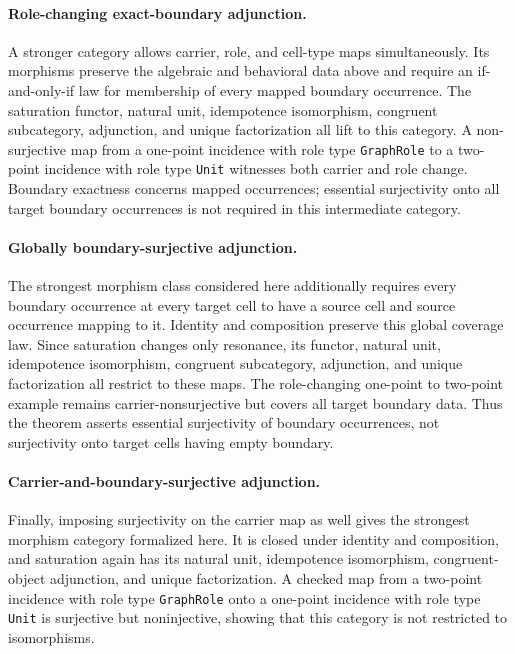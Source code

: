 \documentclass[11pt]{article}
\theoremstyle{definition}
\begin{document}
\paragraph{Role-changing exact-boundary adjunction.}
A stronger category allows carrier, role, and cell-type maps simultaneously.
Its morphisms preserve the algebraic and behavioral data above and require an
if-and-only-if law for membership of every mapped boundary occurrence.  The
saturation functor, natural unit, idempotence isomorphism, congruent
subcategory, adjunction, and unique factorization all lift to this category.  A
non-surjective map from a one-point incidence with role type
\texttt{GraphRole} to a two-point incidence with role type \texttt{Unit}
witnesses both carrier and role change.  Boundary exactness concerns mapped
occurrences; essential surjectivity onto all target boundary occurrences is
not required in this intermediate category.

\paragraph{Globally boundary-surjective adjunction.}
The strongest morphism class considered here additionally requires every
boundary occurrence at every target cell to have a source cell and source
occurrence mapping to it.  Identity and composition preserve this global
coverage law.  Since saturation changes only resonance, its functor, natural
unit, idempotence isomorphism, congruent subcategory, adjunction, and unique
factorization all restrict to these maps.  The role-changing one-point to
two-point example remains carrier-nonsurjective but covers all target boundary
data.  Thus the theorem asserts essential surjectivity of boundary occurrences,
not surjectivity onto target cells having empty boundary.

\paragraph{Carrier-and-boundary-surjective adjunction.}
Finally, imposing surjectivity on the carrier map as well gives the strongest
morphism category formalized here.  It is closed under identity and
composition, and saturation again has its natural unit, idempotence
isomorphism, congruent-object adjunction, and unique factorization.  A checked
map from a two-point incidence with role type \texttt{GraphRole} onto a
one-point incidence with role type \texttt{Unit} is surjective but
noninjective, showing that this category is not restricted to isomorphisms.
\end{document}
